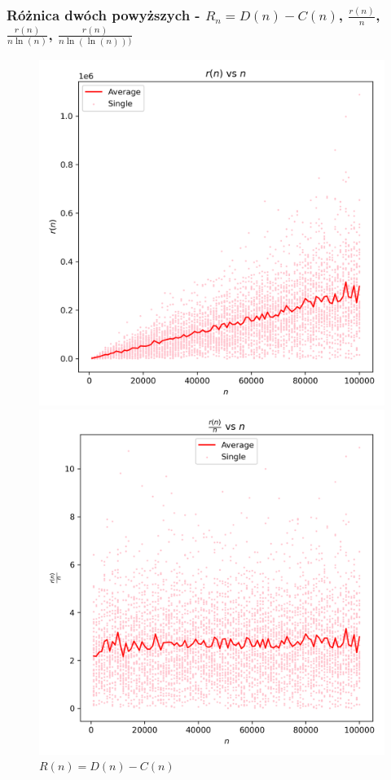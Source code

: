 \documentclass{article}
\begin{document}
\subsubsection{Różnica dwóch powyższych - $R_n=D(n)-C(n)$, $\frac{r(n)}{n}$, $\frac{r(n)}{n\ln(n)}$, $\frac{r(n)}{n\ln(\ln(n)))}$}

\begin{figure}[H]
    \centering
        \begin{minipage}{0.24\textwidth}
        \centering
        \includegraphics[width=\linewidth]{graphs/r_factor_vs_n.png}
        \caption{$R(n)=D(n)-C(n)$}
    \end{minipage}
        \begin{minipage}{0.24\textwidth}
        \centering
        \includegraphics[width=\linewidth]{graphs/r_factor_over_n_vs_n.png}

\end{minipage}
\end{figure}
\end{document}
